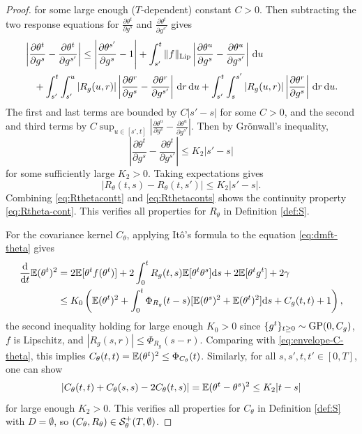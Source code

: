 \begin{proof}
for some large enough ($T$-dependent) constant $C>0$.
Then subtracting the two response equations for
\(\frac{\partial \theta^t}{\partial g^s}\) and
\(\frac{\partial \theta^t}{\partial g^{s'}}\) gives
\begin{align*}
&\left|
\frac{\partial \theta^t}{\partial g^s}
-\frac{\partial \theta^t}{\partial g^{s'}}
\right|
\le
\left|
\frac{\partial \theta^{s'}}{\partial g^s}
-1 \right| +
\int_{s'}^t
\|f\|_{\mathrm{Lip}}
\left|
\frac{\partial \theta^u}{\partial g^s}
-
\frac{\partial \theta^u}{\partial g^{s'}}
\right|
\,\mathrm{d} u \\
&\quad+
\int_{s'}^t\int_{s'}^u
|R_g(u,r)|
\left|
\frac{\partial \theta^r}{\partial g^s}
-
\frac{\partial \theta^r}{\partial g^{s'}}
\right|
\,\mathrm{d} r\,\mathrm{d} u +
\int_{s'}^t\int_s^{s'}
|R_g(u,r)|
\left|
\frac{\partial \theta^r}{\partial g^s}
\right|
\,\mathrm{d} r\,\mathrm{d} u.
\end{align*}
The first and last terms are bounded by \(C|s'-s|\) for some $C>0$, and the
second and third terms by $C \sup_{u \in [s',t]} |
\frac{\partial \theta^u}{\partial g^s}
-\frac{\partial \theta^u}{\partial g^{s'}}|$.
Then by Gr\"onwall's inequality,
\[
\left|
\frac{\partial \theta^t}{\partial g^s}
-
\frac{\partial \theta^t}{\partial g^{s'}}
\right|
\le
K_2|s'-s|
\]
for some sufficiently large $K_2>0$. Taking expectations gives
\begin{equation}\label{eq:Rthetaconts}
\left|R_\theta(t,s)-R_\theta(t,s')\right| \le K_2|s'-s|.
\end{equation}
Combining \eqref{eq:Rthetacontt} and \eqref{eq:Rthetaconts} shows the continuity property \eqref{eq:Rtheta-cont}.
This verifies all properties for $R_\theta$ in Definition \ref{def:S}.

For the covariance kernel $C_\theta$, applying It\^o's formula to 
the equation \eqref{eq:dmft-theta} gives
  \begin{align*}
      \frac{\mathrm{d}}{\mathrm{d} t} \mathbb{E} (\theta^t)^2 &= 2\mathbb{E}[\theta^t f(\theta^t)] + 2\int_0^t
R_g(t,s)\mathbb{E}[\theta^t\theta^s]\mathrm{d} s + 2\mathbb{E}[\theta^t g^t] + 2\gamma\\
      &\le K_0\left(\mathbb{E}(\theta^t)^2+\int_0^t \Phi_{R_g}(t-s) [\mathbb{E} (\theta^s)^2
+ \mathbb{E} (\theta^t)^2] \mathrm{d} s + C_g(t,t)+1\right),
  \end{align*}
the second inequality holding for large enough $K_0>0$
since $\{g^t\}_{t \geq 0} \sim \operatorname{GP}(0,C_g)$, $f$ is Lipschitz, and $|R_g(s,r)|\le
\Phi_{R_g}(s-r)$.
Comparing with \eqref{eq:envelope-C-theta}, this implies 
$C_\theta(t,t)=\mathbb{E}(\theta^t)^2 \le \Phi_{C_\theta}(t)$.
Similarly, for all $s,s',t,t' \in [0,T]$, one can show
\[
|C_\theta(t,t)+C_\theta(s,s)-2C_\theta(t,s)| = \mathbb{E} (\theta^t - \theta^s)^2
\le K_2|t-s|
\]
for large enough $K_2>0$. This verifies all properties for $C_\theta$ in
Definition \ref{def:S} with $D=\emptyset$, so $(C_\theta,R_\theta) \in \mathcal{S}_\theta^+(T,\emptyset)$.


\end{proof}
